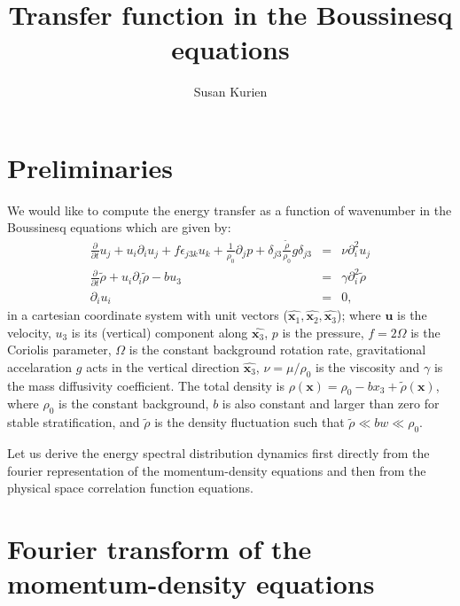 \documentclass[12pt]{article}
\title{Transfer function in the Boussinesq equations}
\author{Susan Kurien}
\begin{document}
\section{Preliminaries}
We would like to compute the energy transfer as a function of
wavenumber in the Boussinesq equations which are given by:
\begin{eqnarray}
\frac{\partial}{\partial t}{u}_j + u_i \partial_i u_j + f\epsilon_{j3k}u_k +
\frac{1}{\rho_0}\partial_j p + \delta_{j3}\frac{\tilde\rho}{\rho_0}g\delta_{j3} &=&
\nu \partial_i^2 u_j\label{momentum}\\ \frac{\partial}{\partial t}\tilde\rho+u_i \partial_i \tilde\rho  -
bu_3 &=& \gamma \partial_i^2 \tilde \rho \label{density}\\ \partial_i u_i &=& 0,
\label{bous}
\end{eqnarray}
in a cartesian coordinate system with unit vectors ($\hat{\bm{x}_1},
\hat{\bm{x}_2}, \hat{\bm{x}_3}$); where $\bm{u}$ is the velocity, $u_3$ is its (vertical) component along $\hat{\bm{x}_3}$, $p$ is the pressure,
$f=2\Omega$ is the Coriolis parameter, $\Omega$ is the constant
background rotation rate, gravitational accelaration $g$ acts in the
vertical direction $\hat{\bm{x}_3}$, $\nu = \mu/\rho_0$ is the
viscosity and $\gamma$ is the mass diffusivity coefficient.  The total
density is $\rho(\bm{x}) = \rho_0 - bx_3 + \tilde\rho(\bm{x})$, where
$\rho_0$ is the constant background, $b$ is also constant and larger
than zero for stable stratification, and $\tilde \rho$ is the density
fluctuation such that $\tilde \rho \ll bw \ll \rho_0$.

Let us derive the energy spectral distribution dynamics first directly
from the fourier representation of the momentum-density equations and
then from the physical space correlation function equations.

\section{Fourier transform of the momentum-density equations}
\end{document}
